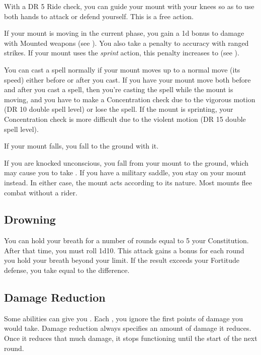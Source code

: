          With a DR 5 Ride check, you can guide your mount with your knees so as to use both hands to attack or defend yourself. This is a free action.

        If your mount is moving in the current phase, you gain a \plus1d bonus to damage with Mounted weapons (see ).
        You also take a  penalty to accuracy with ranged strikes.
        If your mount uses the \textit{sprint} action, this penalty increases to  (see ).

         You can cast a spell normally if your mount moves up to a normal move (its speed) either before or after you cast. If you have your mount move both before and after you cast a spell, then you're casting the spell while the mount is moving, and you have to make a Concentration check due to the vigorous motion (DR 10 \add double spell level) or lose the spell. If the mount is sprinting, your Concentration check is more difficult due to the violent motion (DR 15 \add double spell level).

         If your mount falls, you fall to the ground with it.

         If you are knocked unconscious, you fall from your mount to the ground, which may cause you to take .
        If you have a military saddle, you stay on your mount instead.
        In either case, the mount acts according to its nature.
        Most mounts flee combat without a rider.

    \subsection{Drowning}\label{Drowning}
        You can hold your breath for a number of rounds equal to 5 \add your Constitution.
        After that time, you must roll 1d10.
        This attack gains a  bonus for each round you hold your breath beyond your limit.
        If the result exceeds your Fortitude defense, you take  equal to the difference.

    \subsection{Damage Reduction}\label{Damage Reduction}
        Some abilities can give you .
        Each , you ignore the first points of damage you would take.
        Damage reduction always specifies an amount of damage it reduces.
        Once it reduces that much damage, it stops functioning until the start of the next round.

